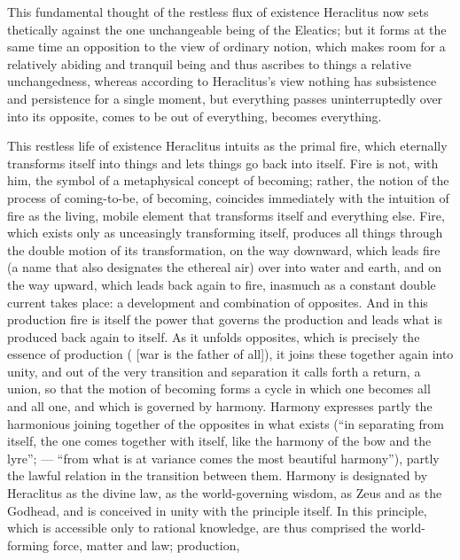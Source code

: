 This fundamental thought of the restless flux of existence Heraclitus
now sets thetically against the one unchangeable being of the Eleatics;
but it forms at the same time an opposition to the view of ordinary
notion, which makes room for a relatively abiding and tranquil being
and thus ascribes to things a relative unchangedness, whereas according
to Heraclitus's view nothing has subsistence and persistence for a
single moment, but everything passes uninterruptedly over into its
opposite, comes to be out of everything, becomes everything.

This restless life of existence Heraclitus intuits as the primal fire,
which eternally transforms itself into things and lets things go back
into itself. Fire is not, with him, the symbol of a metaphysical
concept of becoming; rather, the notion of the process of coming-to-be,
of becoming, coincides immediately with the intuition of fire as the
living, mobile element that transforms itself and everything else.
Fire, which exists only as unceasingly transforming itself, produces
all things through the double motion of its transformation, on the way
downward, which leads fire (a name that also designates the ethereal
air) over into water and earth, and on the way upward, which leads back
again to fire, inasmuch as a constant double current takes place: a
development and combination of opposites. And in this production fire
is itself the power that governs the production and leads what is
produced back again to itself. As it unfolds opposites, which is
precisely the essence of production ( [war is
the father of all]), it joins these together again into unity, and out
of the very transition and separation it calls forth a return, a union,
so that the motion of becoming forms a cycle in which one becomes all
and all one, and which is governed by harmony. Harmony expresses partly
the harmonious joining together of the opposites in what exists (``in
separating from itself, the one comes together with itself, like the
harmony of the bow and the lyre''; --- ``from what is at variance comes
the most beautiful harmony''), partly the lawful relation in
the transition between them. Harmony is designated by Heraclitus as
the divine law, as the world-governing wisdom, as Zeus and as the
Godhead, and is conceived in unity with the principle itself. In this
principle, which is accessible only to rational knowledge, are thus
comprised the world-forming force, matter and law; production,
